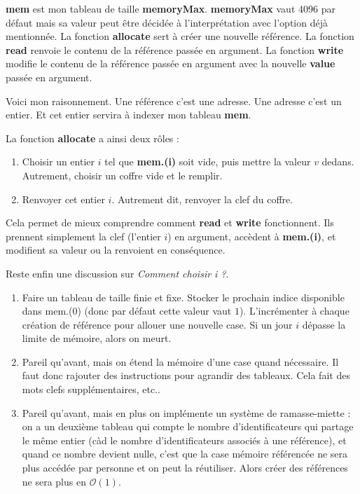 \documentclass[a4paper,10pt]{report}
\begin{document}
\textbf{mem} est mon tableau de taille \textbf{memoryMax}. \textbf{memoryMax} vaut 4096 par défaut mais sa valeur peut être décidée à l'interprétation avec l'option déjà mentionnée. La fonction \textbf{allocate} sert à créer une nouvelle référence. La fonction \textbf{read} renvoie le contenu de la référence passée en argument. La fonction \textbf{write} modifie le contenu de la référence passée en argument avec la nouvelle \textbf{value} passée en argument.
  
Voici mon raisonnement. Une référence c'est une adresse. Une adresse c'est un entier. Et cet entier servira à indexer mon tableau \textbf{mem}.  
  
La fonction \textbf{allocate} a ainsi deux rôles :

\begin{enumerate}
\item Choisir un entier $i$ tel que \textbf{mem.(i)} soit vide, puis mettre la valeur $v$ dedans. Autrement, choisir un coffre vide et le remplir.  
\item Renvoyer cet entier $i$. Autrement dit, renvoyer la clef du coffre.  
\end{enumerate}

Cela permet de mieux comprendre comment \textbf{read} et \textbf{write} fonctionnent. Ils prennent simplement la clef (l'entier $i$) en argument, accèdent à \textbf{mem.(i)}, et modifient sa valeur ou la renvoient en conséquence.  
  
Reste enfin une discussion sur \textit{Comment choisir i ?}.  

\begin{enumerate}
\item Faire un tableau de taille finie et fixe. Stocker le prochain indice disponible dans mem.(0) (donc par défaut cette valeur vaut $1$). L'incrémenter à chaque création de référence pour allouer une nouvelle case. Si un jour $i$ dépasse la limite de mémoire, alors on meurt.
\item Pareil qu'avant, mais on étend la mémoire d'une case quand nécessaire. Il faut donc rajouter des instructions pour agrandir des tableaux. Cela fait des mots clefs supplémentaires, etc..
\item Pareil qu'avant, mais en plus on implémente un système de ramasse-miette : on a un deuxième tableau qui compte le nombre d'identificateurs qui partage le même entier (càd le nombre d'identificateurs associés à une référence), et quand ce nombre devient nulle, c'est que la case mémoire référencée ne sera plus accédée par personne et on peut la réutiliser. Alors créer des références ne sera plus en $\mathcal{O}(1)$.
\end{enumerate}
  
\end{document}
